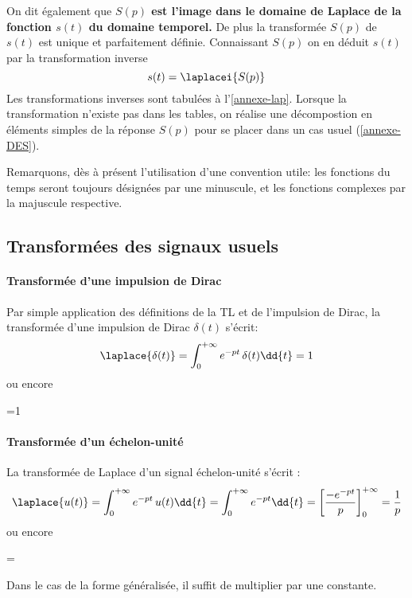 On dit également que \textbf{$S(p)$ est l'image dans le domaine de 
Laplace de la fonction $s(t)$ du domaine temporel.}
De plus la transformée $S(p)$ de $s(t)$ est unique et parfaitement définie. 
Connaissant $S(p)$ on en déduit $s(t)$
par la transformation inverse 
$$
s(t)=\laplacei{S(p)}
$$
Les transformations inverses sont tabulées à l'\cref{annexe-lap}. 
Lorsque la transformation
n'existe pas dans les tables, on réalise une décompostion en éléments 
simples de la réponse 
$S(p)$ pour se placer dans un cas usuel (\cref{annexe-DES}).

Remarquons, dès à présent l'utilisation d'une convention utile: 
les fonctions du temps seront toujours désignées par une
minuscule, et les fonctions complexes par la majuscule respective.

\subsection{Transformées des signaux usuels}

\paragraph{Transformée d'une impulsion de Dirac}
Par simple application des définitions 
de la TL et de l'impulsion de Dirac, la transformée d'une 
impulsion de Dirac $\delta(t)$ s'écrit:
$$
\laplace{\delta(t)}=\int_{0}^{+\infty} e^{-pt}\,\delta(t)\dd{t}=1
$$
ou encore
\begin{bequation}
    =1
\end{bequation}

\paragraph{Transformée d'un échelon-unité}
La transformée de Laplace d'un signal échelon-unité  s'écrit : 
$$
\laplace{u(t)}=\int_{0}^{+\infty} e^{-pt}\,u(t)\dd{t}=\int_{0}^{+\infty} e^{-pt}\dd{t}=\left[\dfrac{-e^{-pt}}{p}\right]_0^{+\infty}=\dfrac{1}{p}
$$
ou encore
\begin{bequation}
    =
\end{bequation}
Dans le cas de la forme généralisée, il suffit de multiplier par une constante.

